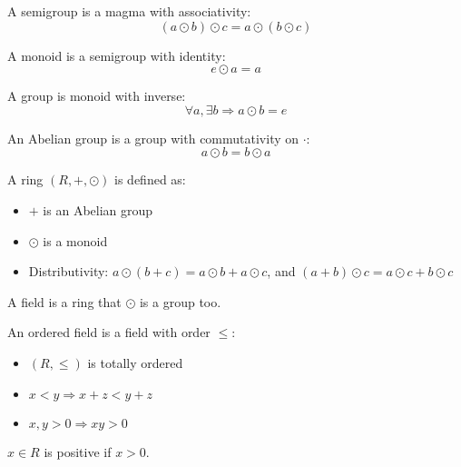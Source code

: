 \begin{definition}
    A semigroup is a magma with associativity:
    \begin{equation}
        (a \odot b) \odot c = a \odot (b \odot c)
    \end{equation}
\end{definition}

\begin{definition}
    A monoid is a semigroup with identity:
    \begin{equation}
        e \odot a = a
    \end{equation}
\end{definition}

\begin{definition}
    A group is monoid with inverse:
    \begin{equation}
        \forall a, \exists b \Rightarrow a \odot b = e
    \end{equation}
\end{definition}

\begin{definition}
    An Abelian group is a group with commutativity on $\cdot$:
    \begin{equation}
        a \odot b = b \odot a
    \end{equation}
\end{definition}

\begin{definition}
    A ring $(R, +, \odot)$ is defined as:
    \begin{itemize}
        \item $+$ is an Abelian group
        \item $\odot$ is a monoid
        \item Distributivity: $a \odot (b + c) = a \odot b + a \odot c$, and $(a+b) \odot c = a \odot c + b \odot c$
    \end{itemize}
    
\end{definition}

\begin{definition}
    A field is a ring that $\odot$ is a group too.
\end{definition}

\begin{definition}
    An ordered field is a field with order $\leq$:
    \begin{itemize}
        \item $(R, \leq)$ is totally ordered
        \item $x < y \Rightarrow x + z < y + z$
        \item $x,y > 0 \Rightarrow xy > 0$
    \end{itemize}
    
    $x \in R$ is positive if $x > 0$.
\end{definition}

